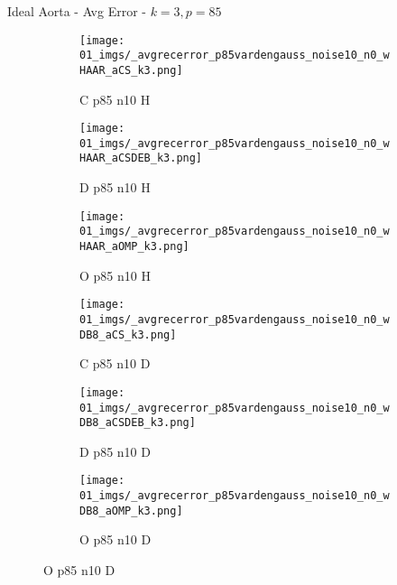 \begin{frame}{Ideal Aorta - Avg Error - $k=3,p=85$}{}
\begin{figure}
\begin{subfigure}{0.13\textwidth}
\texttt{[image: 01\_imgs/\_avgrecerror\_p85vardengauss\_noise10\_n0\_wHAAR\_aCS\_k3.png]}
\caption*{\tiny C p85 n10 H}
\end{subfigure}
\begin{subfigure}{0.13\textwidth}
\texttt{[image: 01\_imgs/\_avgrecerror\_p85vardengauss\_noise10\_n0\_wHAAR\_aCSDEB\_k3.png]}
\caption*{\tiny D p85 n10 H}
\end{subfigure}
\begin{subfigure}{0.13\textwidth}
\texttt{[image: 01\_imgs/\_avgrecerror\_p85vardengauss\_noise10\_n0\_wHAAR\_aOMP\_k3.png]}
\caption*{\tiny O p85 n10 H}
\end{subfigure}
\begin{subfigure}{0.13\textwidth}
\texttt{[image: 01\_imgs/\_avgrecerror\_p85vardengauss\_noise10\_n0\_wDB8\_aCS\_k3.png]}
\caption*{\tiny C p85 n10 D}
\end{subfigure}
\begin{subfigure}{0.13\textwidth}
\texttt{[image: 01\_imgs/\_avgrecerror\_p85vardengauss\_noise10\_n0\_wDB8\_aCSDEB\_k3.png]}
\caption*{\tiny D p85 n10 D}
\end{subfigure}
\begin{subfigure}{0.13\textwidth}
\texttt{[image: 01\_imgs/\_avgrecerror\_p85vardengauss\_noise10\_n0\_wDB8\_aOMP\_k3.png]}
\caption*{\tiny O p85 n10 D}
\end{subfigure}

\vspace{5pt}


\end{figure}
\end{frame}
